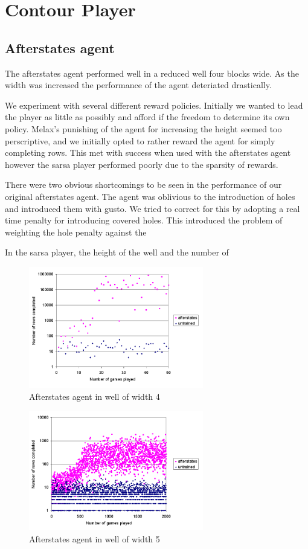 \documentclass{rucsthesis}
\begin{document}
\chapter{Contour Player}

\section{Afterstates agent}

The afterstates agent performed well in a reduced well four blocks wide. As the width was increased the performance of the agent deteriated drastically. 

We experiment with several different reward policies. Initially we wanted to lead the player as little as possibly and afford if the freedom to determine its own policy. Melax's punishing of the agent for increasing the height seemed too perscriptive, and we initially opted to rather reward the agent for simply completing rows. This met with success when used with the afterstates agent however the sarsa player performed poorly due to the sparsity of rewards.

There were two obvious shortcomings to be seen in the performance of our original afterstates agent. The agent was oblivious to the introduction of holes and introduced them with gusto. We tried to correct for this by adopting a real time penalty for introducing covered holes. This introduced the problem of weighting the hole penalty against the  

In the sarsa player, the height of the well and the number of 
\begin{figure}[h]
\centering
\includegraphics[width=3in]{afterstatesredtet4well.png}
\caption{Afterstates agent in well of width 4}
\label{fig:comparemelax}
\end{figure}

\begin{figure}[h]
\centering
\includegraphics[width=3in]{afterstatesredtet5well.png}
\caption{Afterstates agent in well of width 5}
\label{fig:comparemelax}
\end{figure}
\end{document}
